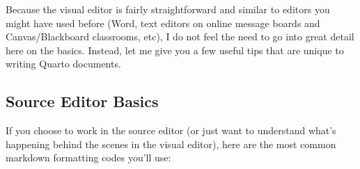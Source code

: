 \documentclass[
  letterpaper,
]{book}
\begin{document}
Because the visual editor is fairly straightforward and similar to
editors you might have used before (Word, text editors on online message
boards and Canvas/Blackboard classrooms, etc), I do not feel the need to
go into great detail here on the basics. Instead, let me give you a few
useful tips that are unique to writing Quarto documents.

\subsection{Source Editor Basics}\label{source-editor-basics}

If you choose to work in the source editor (or just want to understand
what's happening behind the scenes in the visual editor), here are the
most common markdown formatting codes you'll use:
\end{document}
